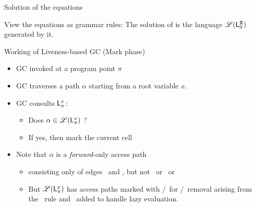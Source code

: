 \documentclass[xcolor=x11names,compress,mathserif]{beamer}
\renewcommand{\(}{\begin{columns}}
\renewcommand{\)}{\end{columns}}
\newcommand{\<}[1]{\begin{column}{#1}}
\renewcommand{\>}{\end{column}}
\begin{document}
\begin{frame}{Solution of the equations}

  View the equations as grammar rules:
  \linebreak
  \linebreak
  \linebreak
  The  solution of  is the   language  $\mathscr{L}(\mathsf{L}_{{9}}^{\mbox{\tt x}})$ generated    by    it.
\end{frame}


\begin{frame}{Working of Liveness-based GC (Mark phase)}
  \begin{itemize}
  \item GC invoked at a program point $\pi$
  \item GC traverses a path $\alpha$ starting from a root variable $x$.
  \item GC consults $\mathsf{L}_{{\pi}}^{x}$: 
    \begin{itemize}
    \item Does $\alpha \in \mathscr{L}(\mathsf{L}_{{\pi}}^{x})$ ?
    \item If yes, then mark the current cell
    \end{itemize}
    \pause
  \item  Note  that  $\alpha$  is a  {\em  forward}-only  access  path
    \begin{itemize}
    \item consisting  only of  edges \acar\  and \acdr,  but not  \bcar\ or
      \bcdr\ or \clazy
    \item But $\mathscr{L}(\mathsf{L}_{{\pi}}^{x})$ has access paths marked with \bcar/\bcdr\ for \acar/\acdr\  removal
  arising from the \CONS\  rule and \clazy\ added to handle lazy evaluation.
    \end{itemize}
  \end{itemize}
\end{frame}
\end{document}
